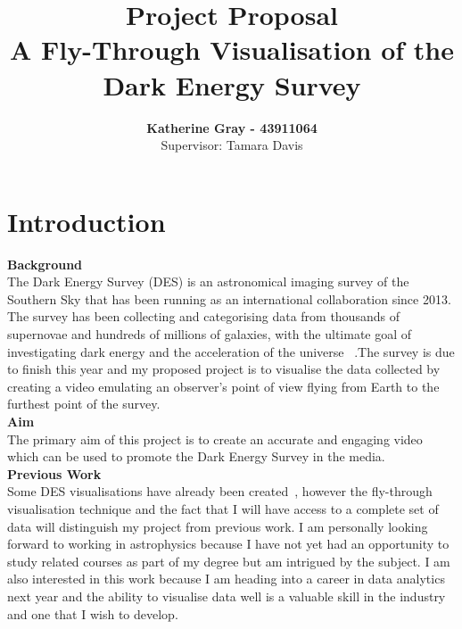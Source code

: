 \documentclass[pra, reprint, A4 paper, bibnotes]{revtex4-1}
\begin{document}
\title{Project Proposal\\A Fly-Through Visualisation of the Dark Energy Survey}
\author{\textbf{Katherine Gray - 43911064}\\ Supervisor: Tamara Davis}

\maketitle %

\thispagestyle{fancy} %
\section{Introduction}
\textbf{Background}\\
The Dark Energy Survey (DES) is an astronomical imaging survey of the Southern Sky that has been running as an international collaboration since 2013. The survey has been collecting and categorising data from thousands of supernovae and hundreds of millions of galaxies, with the ultimate goal of investigating dark energy and the acceleration of the universe ~\cite{dark_energy_survey_collaboration_dark_2016}.The survey is due to finish this year and my proposed project is to visualise the data collected by creating a video emulating an observer's point of view flying from Earth to the furthest point of the survey. \\

\textbf{Aim}\\
The primary aim of this project is to create an accurate and engaging video which can be used to promote the Dark Energy Survey in the media.\\

\textbf{Previous Work}\\
Some DES visualisations have already been created~\cite{samuel_hinton_+ozdes+sdss_2017, ralf_kaehler_year_2017}, however the fly-through visualisation technique and the fact that I will have access to a complete set of data will distinguish my project from previous work. I am personally looking forward to working in astrophysics because I have not yet had an opportunity to study related courses as part of my degree but am intrigued by the subject. I am also interested in this work because I am heading into a career in data analytics next year and the ability to visualise data well is a valuable skill in the industry and one that I wish to develop. 
\end{document}
